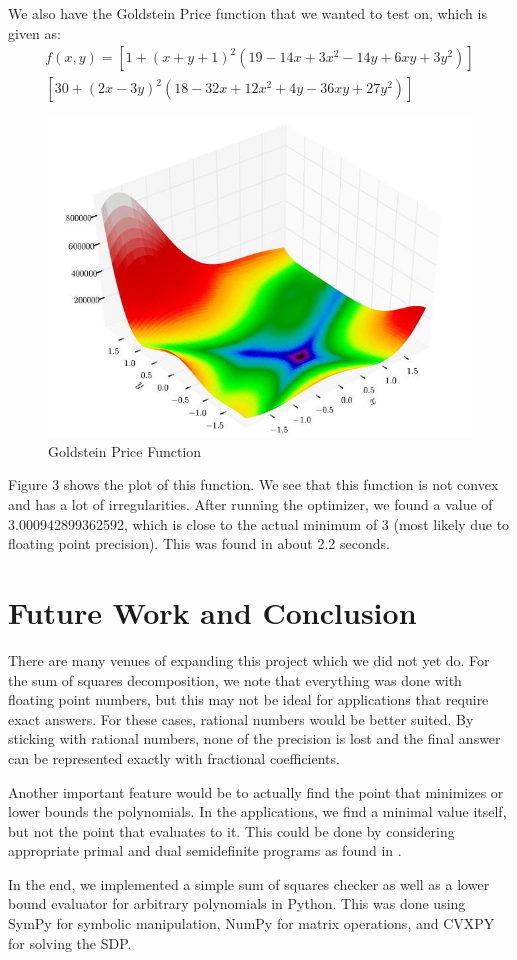 \documentclass{article}
\begin{document}
We also have the Goldstein Price function that we wanted to test on, which is given as:
\begin{align*}
f(x,y)=[1 + (x + y + 1)^2(19 - 14x+3x^2 - 14y + 6xy + 3y^2)]\\
[30 + (2x - 3y)^2(18 - 32x + 12x^2 + 4y- 36xy + 27y^2)]
\end{align*}

\begin{figure}[H]
	\centering
	\includegraphics[scale=1]{goldstein} 
	\caption{Goldstein Price Function \cite{goldstein}}
\end{figure}

Figure 3 shows the plot of this function. We see that this function is not convex and has a lot of irregularities. After running the optimizer, we found a value of 3.000942899362592, which is close to the actual minimum of 3 (most likely due to floating point precision). This was found in about 2.2 seconds.

\section{Future Work and Conclusion}

There are many venues of expanding this project which we did not yet do. For the sum of squares decomposition, we note that everything was done with floating point numbers, but this may not be ideal for applications that require exact answers. For these cases, rational numbers would be better suited. By sticking with rational numbers, none of the precision is lost and the final answer can be represented exactly with fractional coefficients.

Another important feature would be to actually find the point that minimizes or lower bounds the polynomials. In the applications, we find a minimal value itself, but not the point that evaluates to it. This could be done by considering appropriate primal and dual semidefinite programs as found in \cite{Parrilo03minimizingpolynomial}.

In the end, we implemented a simple sum of squares checker as well as a lower bound evaluator for arbitrary polynomials in Python. This was done using SymPy for symbolic manipulation, NumPy for matrix operations, and CVXPY for solving the SDP.




\end{document}

